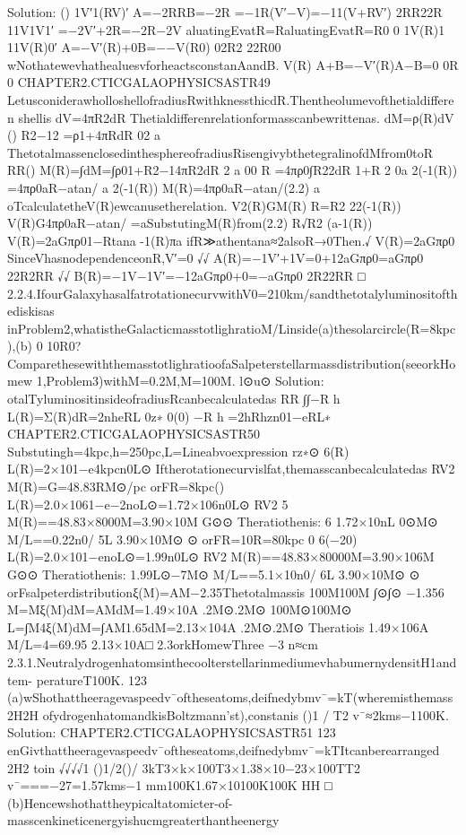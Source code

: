 Solution:
()
1V′1(RV)′
A=−2RRB=−2R
=−1R(V′−V)=−11(V+RV′)
2RR22R
11V1V1′
=−2V′+2R=−2R−2V
aluatingEvatR=RaluatingEvatR=R0
0
1V(R)1
11V(R)0′
A=−V′(R)+0B=−−V(R0)
02R2
22R00
wNothatewevhathealuesvforheactsconstanAandB.
V(R)
A+B=−V′(R)A−B=0
0R
0
CHAPTER2.CTICGALAOPHYSICSASTR49
LetusconiderawholloshellofradiusRwithknessthicdR.Thentheolumevofthetialdifferen
shellis
dV=4πR2dR
Thetialdifferenrelationformasscanbewrittenas.
dM=ρ(R)dV
()
R2−12
=ρ1+4πRdR
02
a
ThetotalmassenclosedinthesphereofradiusRisengivybthetegralinofdMfrom0toR
RR()
M(R)=∫dM=∫ρ01+R2−14πR2dR
2
a
00
R
=4πρ0∫R22dR
1+R
2
0a
2(-1(R))
=4πρ0aR−atan/
a
2(-1(R))
M(R)=4πρ0aR−atan/(2.2)
a
oTcalculatetheV(R)ewcanusetherelation.
V2(R)GM(R)
R=R2
22(-1(R))
V(R)G4πρ0aR−atan/
=aSubstutingM(R)from(2.2)
R√R2
(a-1(R))
V(R)=2aGπρ01−Rtana
-1(R)πa
ifR≫athentana≈2alsoR→0Then.√
V(R)=2aGπρ0
SinceVhasnodependenceonR,V′=0
√√
A(R)=−1V′+1V=0+12aGπρ0=aGπρ0
22R2RR
√√
B(R)=−1V−1V′=−12aGπρ0+0=−aGπρ0
2R22RR
□
2.2.4.IfourGalaxyhasalfatrotationecurvwithV0=210km/sandthetotalyluminositofthediskisas
inProblem2,whatistheGalacticmasstotlighratioM/Linside(a)thesolarcircle(R=8kpc),(b)
0
10R0?ComparethesewiththemasstotlighratioofaSalpeterstellarmassdistribution(seeorkHomew
1,Problem3)withM=0.2M,M=100M.
l⊙u⊙
Solution:
otalTyluminositinsideofradiusRcanbecalculatedas
RR
∫∫−R
h
L(R)=Σ(R)dR=2nheRL
0z∗
0(0)
−R
h
=2hRhzn01−eRL∗
CHAPTER2.CTICGALAOPHYSICSASTR50
Substutingh=4kpc,h=250pc,L=Lineabvoexpression
rz∗⊙
6(R)
L(R)=2×101−e4kpcn0L⊙
Iftherotationecurvislfat,themasscanbecalculatedas
RV2
M(R)=G=48.83RM⊙/pc
orFR=8kpc()
L(R)=2.0×1061−e−2noL⊙=1.72×106n0L⊙
RV2
5
M(R)==48.83×8000M=3.90×10M
G⊙⊙
Theratiothenis:
6
1.72×10nL
0⊙M⊙
M/L==0.22n0/
5L
3.90×10M⊙
⊙
orFR=10R=80kpc
0
6(−20)
L(R)=2.0×101−enoL⊙=1.99n0L⊙
RV2
M(R)==48.83×80000M=3.90×106M
G⊙⊙
Theratiothenis:
1.99L⊙−7M⊙
M/L==5.1×10n0/
6L
3.90×10M⊙
⊙
orFsalpeterdistributionξ(M)=AM−2.35Thetotalmassis
100M100M
∫⊙∫⊙
−1.356
M=Mξ(M)dM=AMdM=1.49×10A
.2M⊙.2M⊙
100M⊙100M⊙
L=∫M4ξ(M)dM=∫AM1.65dM=2.13×104A
.2M⊙.2M⊙
Theratiois
1.49×106A
M/L=4=69.95
2.13×10A□
2.3orkHomewThree
−3
n≈cm
2.3.1.NeutralydrogenhatomsinthecoolterstellarinmediumevhabumernydensitH1andtem-
peratureT100K.
123
(a)wShothattheeragevaspeedv¯oftheseatoms,deifnedybmv¯=kT(wheremisthemass
2H2H
ofydrogenhatomandkisBoltzmann’st),constanis
()1
/
T2
v¯≈2kms−1100K.
Solution:
CHAPTER2.CTICGALAOPHYSICSASTR51
123
enGivthattheeragevaspeedv¯oftheseatoms,deifnedybmv¯=kTItcanberearranged
2H2
toin
√√√√1
()1/2()/
3kT3×k×100T3×1.38×10−23×100TT2
v¯===−27=1.57kms−1
mm100K1.67×10100K100K
HH
□
(b)Hencewshothattheypicaltatomicter-of-masscenkineticenergyishucmgreaterthantheenergy
